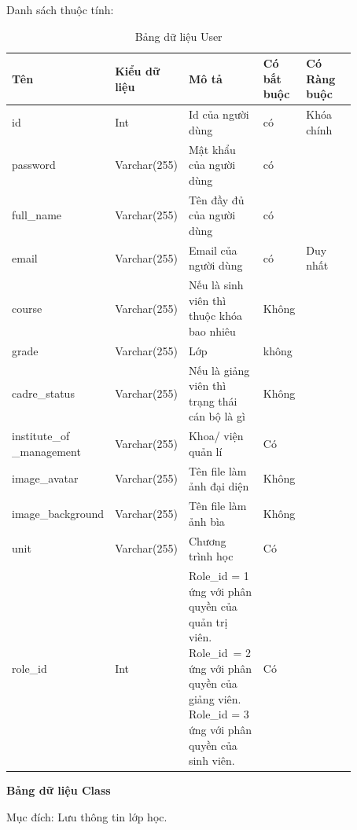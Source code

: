 \documentclass[../Main.tex]{subfiles}
\begin{document}
Danh sách thuộc tính: 
\begin{table}[H]
\centering
\bgroup
\renewcommand{\arraystretch}{1.5}%
\begin{tabular}{|L{0.2\linewidth}|L{0.2\linewidth}|L{0.22\linewidth}|L{0.1\linewidth}|L{0.15\linewidth}|}
\hline
\textbf{Tên} & \textbf{Kiểu dữ liệu} & \textbf{Mô tả} & \textbf{Có bắt buộc} & \textbf{Có Ràng buộc} \\ \hline
id & Int & Id của người dùng & có & Khóa chính \\ \hline
password & Varchar(255) & Mật khẩu của người dùng & có &  \\ \hline
full\_name & Varchar(255) & Tên đầy đủ của người dùng & có &  \\ \hline
email & Varchar(255) & Email của  người dùng & có & Duy nhất \\ \hline
course & Varchar(255) & Nếu là sinh viên thì thuộc khóa bao nhiêu & Không &  \\ \hline
grade & Varchar(255) & Lớp & không &  \\ \hline
cadre\_status & Varchar(255) & Nếu là giảng viên thì trạng thái cán bộ là gì & Không &  \\ \hline
institute\_of \_management & Varchar(255) & Khoa/ viện quản lí & Có &  \\ \hline
image\_avatar & Varchar(255) & Tên file làm ảnh đại diện & Không &  \\ \hline
image\_background & Varchar(255) & Tên file làm ảnh bìa & Không &  \\ \hline
unit & Varchar(255) & Chương trình học & Có &  \\ \hline
role\_id & Int & Role\_id = 1  ứng với phân quyền của quản trị viên.  Role\_id\ = 2 ứng với  phân quyền của giảng viên. Role\_id = 3 ứng với phân quyền của sinh viên. & Có &  \\ \hline
\end{tabular}
\egroup
\caption{Bảng dữ liệu User}
\end{table}

\textbf{Bảng dữ liệu Class}

Mục đích: Lưu thông tin lớp học. 
\end{document}
